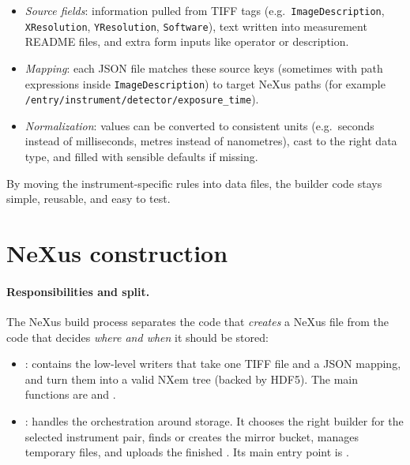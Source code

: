 \begin{itemize}
	\item \emph{Source fields}: information pulled from TIFF tags (e.g.\ \texttt{ImageDescription}, \texttt{XResolution}, \texttt{YResolution}, \texttt{Software}), 
	text written into measurement README files, and extra form inputs like operator or description.
	\item \emph{Mapping}: each JSON file matches these source keys (sometimes with path expressions inside \texttt{ImageDescription}) 
	to target NeXus paths (for example \texttt{/entry/instrument/detector/exposure\_time}).
	\item \emph{Normalization}: values can be converted to consistent units (e.g.\ seconds instead of milliseconds, metres instead of nanometres), 
	cast to the right data type, and filled with sensible defaults if missing.
\end{itemize}

By moving the instrument-specific rules into data files, the builder code stays simple, reusable, and easy to test.


\section{NeXus construction}\label{sec:nexus-construction}

\paragraph{Responsibilities and split.}
The NeXus build process separates the code that \emph{creates} a NeXus file 
from the code that decides \emph{where and when} it should be stored:

\begin{itemize}
	\item {}: contains the low-level writers that take one TIFF file and a JSON mapping, 
	and turn them into a valid NXem tree (backed by HDF5). 
	The main functions are  and .
	
	\item {}: handles the orchestration around storage. 
	It chooses the right builder for the selected instrument pair, finds or creates the mirror bucket, 
	manages temporary files, and uploads the finished . 
	Its main entry point is .
\end{itemize}

